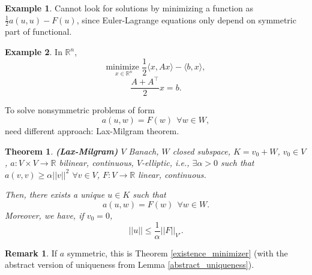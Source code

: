 \documentclass[12pt]{article}
\newtheorem{theorem}{Theorem}[section]
\theoremstyle{definition}
\newtheorem*{remark}{Remark}
\newtheorem*{example*}{Example}
\begin{document}
\begin{example*}
Cannot look for solutions by minimizing a function as $\frac12a(u,u)-F(u)$, since Euler-Lagrange equations only depend on symmetric part of functional.
\end{example*}

\begin{example*}
In $\mathbb R^n$,
\[\underset{x\in\mathbb R^n}{\text{minimize }}\frac12\langle x,Ax\rangle-\langle b,x\rangle,\]
\[\frac{A+A^\intercal}2x=b.\]

To solve nonsymmetric problems of form
\[a(u,w)=F(w)\ \ \forall w\in W,\]
need different approach: Lax-Milgram theorem.
\end{example*}

\begin{theorem}
\emph{\textbf{(Lax-Milgram)}} $V$ Banach, $W$ closed subspace, $K=v_0+W$, $v_0\in V$, $a:V\times V\rightarrow\mathbb R$ bilinear, continuous, $V$-elliptic, i.e., $\exists\alpha>0$ such that $a(v,v)\geq\alpha||v||^2$ $\forall v\in V$, $F:V\rightarrow\mathbb R$ linear, continuous.

Then, there exists a unique $u\in K$ such that
\[a(u,w)=F(w)\ \ \forall w\in W.\]
Moreover, we have, if $v_0=0$,
\[||u||\leq\frac1\alpha||F||_{V'}.\]
\end{theorem}

\begin{remark}
If $a$ symmetric, this is Theorem \ref{existence_minimizer} (with the abstract version of uniqueness from Lemma \ref{abstract_uniqueness}).
\end{remark}
\end{document}
